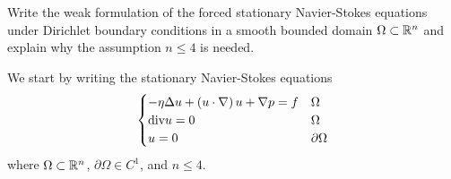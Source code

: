 \newpage
\begin{exercise}
    Write the weak formulation of the forced stationary Navier-Stokes equations under Dirichlet boundary conditions in a smooth bounded domain \(\Omega \subset \mathbb{R}^n\) and explain why the assumption \(n \leq 4\) is needed.
\end{exercise}
We start by writing the stationary Navier-Stokes equations
\[
    \begin{cases}
        - \eta \Delta u + \left( u \cdot \nabla \right) u + \nabla p = f & \Omega         \\
        \text{div} u = 0                                                     & \Omega         \\
        u = 0                                                          & \partial\Omega
    \end{cases}
\]
where \(\Omega \subset \mathbb{R}^n\), \(\partial\Omega \in C^1\), and \(n \leq 4\).
